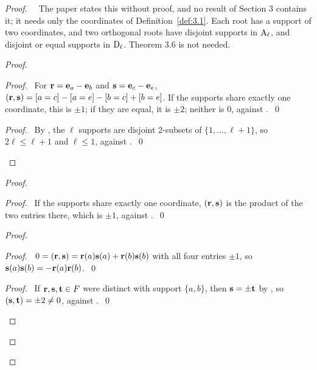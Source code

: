 \begin{proof}
 \pfsketch\ \new\ The paper states this without proof, and no result of Section 3 contains it;
 it needs only the coordinates of Definition~\ref{def:3.1}. Each root has a support of two
 coordinates, and two orthogonal roots have disjoint supports in $\mathrm{A}_\ell$, and disjoint or
 equal supports in $\mathrm{D}_\ell$. Theorem 3.6 is not needed.
 \begin{proof}
  \begin{proof}\pf\ For ${\mathbf r}={\mathbf e}_a-{\mathbf e}_b$ and ${\mathbf s}={\mathbf e}_c-{\mathbf e}_e$,
   $({\mathbf r},{\mathbf s})=[a=c]-[a=e]-[b=c]+[b=e]$. If the supports share exactly one coordinate, this is
   $\pm1$; if they are equal, it is $\pm2$; neither is 0, against .~\qed\end{proof}
  \qedstep
  \begin{proof}\pf\ By , the $\ell$ supports are disjoint 2-subsets of
   $\{1,\dots,\ell+1\}$, so $2\ell\leq\ell+1$ and $\ell\leq1$, against .~\qed\end{proof}
 \end{proof}
 \begin{proof}
  \begin{proof}\pf\ If the supports share exactly one coordinate, $({\mathbf r},{\mathbf s})$ is the product of
   the two entries there, which is $\pm1$, against .~\qed\end{proof}
  \begin{proof}
   \begin{proof}\pf\ $0=({\mathbf r},{\mathbf s})={\mathbf r}(a){\mathbf s}(a)+{\mathbf r}(b){\mathbf s}(b)$ with all four entries $\pm1$, so
    ${\mathbf s}(a){\mathbf s}(b)=-{\mathbf r}(a){\mathbf r}(b)$.~\qed\end{proof}
   \qedstep
   \begin{proof}\pf\ If ${\mathbf r},{\mathbf s},{\mathbf t}\in F$ were distinct with support $\{a,b\}$, then
    ${\mathbf s}=\pm{\mathbf t}$ by , so $({\mathbf s},{\mathbf t})=\pm2\neq0$, against .~\qed
   \end{proof}
  \end{proof}

\end{proof}
\end{proof}
